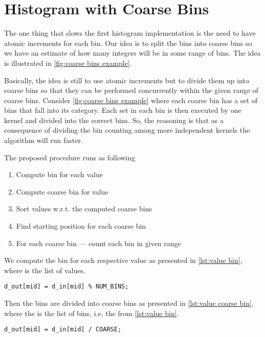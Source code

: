 \section{Histogram with Coarse Bins}
\label{sec:coarse bin histogram}

The one thing that slows the first histogram implementation is the need to have atomic increments for each bin.
Our idea is to split the bins into coarse bins so we have an estimate of how many integers will be in some range of bins.
The idea is illustrated in \cref{fig:coarse bins example}.

Basically, the idea is still to use atomic increments but to divide them up into coarse bins so that they can be performed concurrently within the given range of coarse bins.
Consider \cref{fig:coarse bins example} where each coarse bin has a set of bins that fall into its category.
Each set in each bin is then executed by one kernel and divided into the correct bins.
So, the reasoning is that as a consequence of dividing the bin counting among more independent kernels the algorithm will run faster.

The proposed procedure runs as following
%
\begin{enumerate}
  \item Compute bin for each value
  \item Compute coarse bin for value
  \item Sort values w.r.t. the computed coarse bins
  \item Find starting position for each coarse bin
  \item For each coarse bin --- count each bin in given range
\end{enumerate}
%
We compute the bin for each respective value as presented in \cref{lst:value bin}, where  is the list of values.

\begin{lstlisting}[caption={compute each value's bin}, label={lst:value bin}, numbers=none]
d_out[mid] = d_in[mid] % NUM_BINS;
\end{lstlisting}

Then the bins are divided into coarse bins as presented in \cref{lst:value coarse bin}, where the  is the list of bins, i.e. the  from \cref{lst:value bin}.

\begin{lstlisting}[caption={compute each value's coarse bin}, label={lst:value coarse bin}, numbers=none]
d_out[mid] = d_in[mid] / COARSE;
\end{lstlisting}

